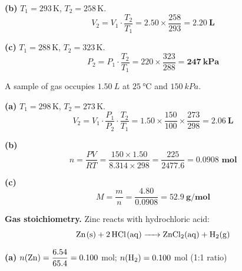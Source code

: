 \documentclass[addpoints]{exam}
\begin{document}
\begin{questions}
\begin{solution}[10cm]
\textbf{(b)} $T_1 = 293\,\text{K}$,\; $T_2 = 258\,\text{K}$.
\[
V_2 = V_1 \cdot \frac{T_2}{T_1} = 2.50 \times \frac{258}{293} = \mathbf{\SI{2.20}{L}}
\]

\textbf{(c)} $T_1 = 288\,\text{K}$,\; $T_2 = 323\,\text{K}$.
\[
P_2 = P_1 \cdot \frac{T_2}{T_1} = 220 \times \frac{323}{288} = \mathbf{\SI{247}{kPa}}
\]
\end{solution}

\question A sample of gas occupies $\SI{1.50}{L}$ at $\SI{25}{\celsius}$ and
$\SI{150}{kPa}$.
\begin{solution}[9cm]
\textbf{(a)} $T_1 = 298\,\text{K}$,\; $T_2 = 273\,\text{K}$.
\[
V_2 = V_1 \cdot \frac{P_1}{P_2} \cdot \frac{T_2}{T_1}
= 1.50 \times \frac{150}{100} \times \frac{273}{298} = \mathbf{\SI{2.06}{L}}
\]

\textbf{(b)}
\[
n = \frac{PV}{RT} = \frac{150 \times 1.50}{8.314 \times 298} = \frac{225}{2477.6}
= \mathbf{0.0908 \text{ mol}}
\]

\textbf{(c)}
\[
M = \frac{m}{n} = \frac{4.80}{0.0908} = \mathbf{\SI{52.9}{g/mol}}
\]
\end{solution}

\question \textbf{Gas stoichiometry.} Zinc reacts with hydrochloric acid:
\[\ce{Zn(s) + 2HCl(aq) -> ZnCl2(aq) + H2(g)}\]
\begin{solution}[9cm]
\textbf{(a)} $n(\ce{Zn}) = \dfrac{6.54}{65.4} = 0.100$ mol;\quad
$n(\ce{H2}) = 0.100$ mol (1:1 ratio)


\end{solution}
\end{questions}
\end{document}
